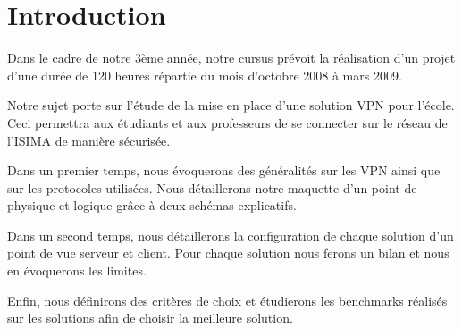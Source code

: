 \section*{Introduction}
Dans le cadre de notre 3ème année, notre cursus prévoit la réalisation d’un projet d’une durée de 120 heures répartie du mois d’octobre 2008 à mars 2009. 

Notre sujet porte sur l'étude de la mise en place d'une solution VPN pour l'école. Ceci permettra aux étudiants et aux professeurs de se connecter sur le réseau de l'ISIMA de manière sécurisée.


Dans un premier temps, nous évoquerons des généralités sur les VPN ainsi que sur les protocoles utilisées. Nous détaillerons notre maquette d'un point de physique et logique grâce à deux schémas explicatifs.


Dans un second temps, nous détaillerons la configuration de chaque solution d'un point de vue serveur et client. Pour chaque solution nous ferons un bilan et nous en évoquerons les limites. 



Enfin, nous définirons des critères de choix et étudierons les benchmarks réalisés sur les solutions afin de choisir la meilleure solution.




\pagebreak
